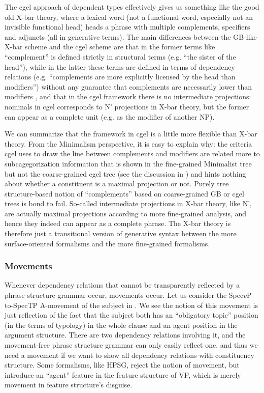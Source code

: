 \documentclass[../main.tex]{subfiles}
\begin{document}

The \ac{cgel} approach of dependent types effectively gives us something like the good old X-bar theory, where a lexical word 
(not a functional word, especially not an invisible functional head) heads a phrase with multiple 
complements, specifiers and adjuncts (all in generative terms). The main differences between the GB-like 
X-bar scheme and the \ac{cgel} scheme are that in the former terms like ``complement'' is defined strictly 
in structural terms (e.g. ``the sister of the head''), while in the latter these terms are defined in 
terms of dependency relations (e.g. ``complements are more explicitly licensed by the head than 
modifiers'') without any guarantee that complements are necessarily lower than modifiers \citep{payne2007fusion},
and that in the \ac{cgel} framework there is no intermediate projections: nominals in \ac{cgel} corresponds 
to N' projections in X-bar theory, but the former can appear as a complete unit (e.g. as the modifier of another 
NP). 

We can summarize that the framework in \ac{cgel} is a little more flexible than X-bar theory. 
From the Minimalism perspective, it is easy to explain why: the criteria \ac{cgel} uses to draw the line 
between complements and modifiers are related more to subcagegorization information that is shown in the 
fine-grained Minimalist tree but not the coarse-grained \ac{cgel} tree (see the discussion 
in ) and hints nothing about whether a constituent is a maximal projection or not. 
Purely tree structure-based notion of ``complements'' based on coarse-grained GB or \ac{cgel} trees is bond to fail. 
So-called intermediate projections in X-bar theory, like N', are actually maximal projections according to 
more fine-grained analysis, and hence they indeed can appear as a complete phrase.
The X-bar theory is therefore just a transitional version of generative syntax between the more surface-oriented
formalisms and the more fine-grained formalisms.

\subsubsection{Movements}

Whenever dependency relations that cannot be transparently reflected by a phrase structure grammar occur,
movements occur. Let us consider the Spec$v$P-to-SpecTP A-movement of the subject in . We see the notion of this movement is just reflection of the fact 
that the subject both has an ``obligatory topic'' position (in the terms of typology) in the whole clause 
and an agent position in the argument structure. There are two dependency relations involving it, and 
the movement-free phrase structure grammar can only easily reflect one, and thus we need a movement 
if we want to show all dependency relations with constituency structure. Some formalisms, like HPSG,
reject the notion of movement, but introduce an ``agent'' feature in the feature structure of 
VP, which is merely movement in feature structure's disguise. 
\end{document}
